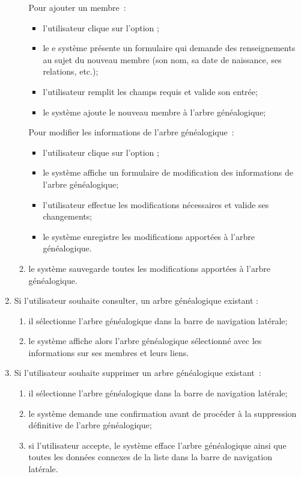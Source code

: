 \begin{enumerate}
\begin{enumerate}
        \subitem Pour ajouter un membre :

          \begin{itemize}
            \item l’utilisateur clique sur l’option ;
            \item le e système présente un formulaire qui demande des
              renseignements au sujet du nouveau membre (son nom, sa date de
              naissance, ses relations, etc.);
            \item l’utilisateur remplit les champs requis et valide son entrée;
            \item le système ajoute le nouveau membre à l’arbre généalogique;
          \end{itemize}

        \subitem Pour modifier les informations de l’arbre généalogique :

          \begin{itemize}
            \item l’utilisateur clique sur l’option ;
            \item le système affiche un formulaire de modification des informations de l’arbre généalogique;
            \item l’utilisateur effectue les modifications nécessaires et valide ses changements;
            \item le système enregistre les modifications apportées à l’arbre généalogique.
          \end{itemize}

      \item le système sauvegarde toutes les modifications apportées à l’arbre généalogique.
    \end{enumerate}

  \item Si l’utilisateur souhaite consulter, un arbre généalogique existant :
    \begin{enumerate}
      \item il sélectionne l’arbre généalogique dans la barre de navigation latérale;
      \item le système affiche alors l’arbre généalogique sélectionné avec les
        informations sur ses membres et leurs liens.
    \end{enumerate}

  \item Si l’utilisateur souhaite supprimer un arbre généalogique existant :
    \begin{enumerate}
      \item il sélectionne l’arbre généalogique dans la barre de navigation latérale;
      \item le système demande une confirmation avant de procéder à la
        suppression définitive de l’arbre généalogique;
      \item si l’utilisateur accepte, le système efface l’arbre généalogique
        ainsi que toutes les données connexes de la liste dans la barre de
        navigation latérale.
    \end{enumerate}


\end{enumerate}
